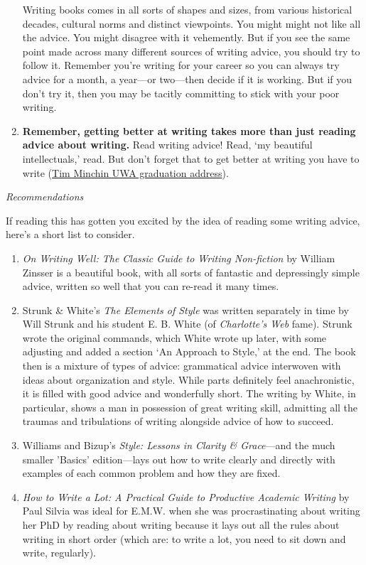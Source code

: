 \documentclass[11pt,letter]{article}
\begin{document}
\begin{enumerate}
Writing books comes in all sorts of shapes and sizes, from various historical decades, cultural norms and distinct viewpoints. You might might not like all the advice. You might disagree with it vehemently. But if you see the same point made across many different sources of writing advice, you should try to follow it. Remember you're writing for your career so you can always try advice for a month, a year---or two---then decide if it is working. But if you don't try it, then you may be tacitly committing to stick with your poor writing. 
\item {\bf Remember, getting better at writing takes more than just reading advice about writing.} Read writing advice! Read,  `my beautiful intellectuals,' read.  But don't forget that to get better at writing you have to write (\href{https://www.youtube.com/watch?v=yoEezZD71sc}{Tim Minchin UWA graduation address}). %
\end{enumerate}


\emph{Recommendations}

If reading this has gotten you excited by the idea of reading some writing advice, here's a short list to consider. 
\begin{enumerate}
\item \emph{On Writing Well: The Classic Guide to Writing Non-fiction} by William Zinsser is a beautiful book, with all sorts of fantastic and depressingly simple advice, written so well that you can re-read it many times. 
\item Strunk \& White’s \emph{The Elements of Style} was written separately in time by Will Strunk and his student E. B. White (of \emph{Charlotte’s Web} fame). Strunk wrote the original commands, which White wrote up later, with some adjusting and added a section `An Approach to Style,’ at the end. The book then is a mixture of types of advice: grammatical advice interwoven with ideas about organization and style. While parts definitely feel anachronistic, it is filled with good advice and wonderfully short. The writing by White, in particular, shows a man in possession of great writing skill, admitting all the traumas and tribulations of writing alongside advice of how to succeed. 
\item Williams and Bizup's \emph{Style: Lessons in Clarity \& Grace}---and the much smaller 'Basics' edition---lays out how to write clearly and directly with examples of each common problem and how they are fixed. 
\item \emph{How to Write a Lot: A Practical Guide to Productive Academic Writing} by Paul Silvia was ideal for E.M.W. when she was procrastinating about writing her PhD by reading about writing because it lays out all the rules about writing in short order (which are: to write a lot, you need to sit down and write, regularly). 
\end{enumerate}
\end{document}
